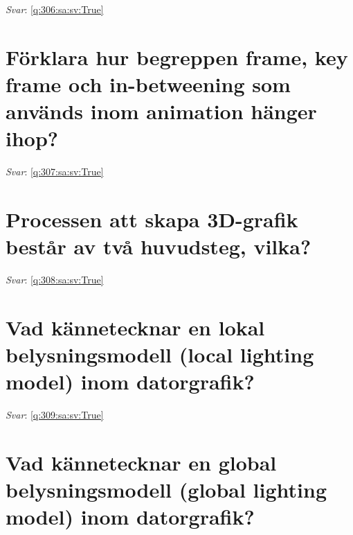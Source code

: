 \documentclass[a4paper,11pt,oneside]{book}
\begin{document}
\begin{sloppypar}
\vspace{1cm}

\textit{Svar}: \autoref{q:306:sa:sv:True}



\section{F\"orklara hur begreppen frame, key frame och in-betweening som anv\"ands inom animation h\"anger ihop?}

\label{q:307:sa:sv:False}

\vspace{2cm}

\noindent\makebox[\textwidth]{\hrulefill}

\vspace{1cm}

\textit{Svar}: \autoref{q:307:sa:sv:True}



\section{Processen att skapa 3D-grafik best\r{a}r av tv\r{a} huvudsteg, vilka?}

\label{q:308:sa:sv:False}

\vspace{2cm}

\noindent\makebox[\textwidth]{\hrulefill}

\vspace{1cm}

\textit{Svar}: \autoref{q:308:sa:sv:True}



\section{Vad k\"annetecknar en lokal belysningsmodell (local lighting model) inom datorgrafik?}

\label{q:309:sa:sv:False}

\vspace{2cm}

\noindent\makebox[\textwidth]{\hrulefill}

\vspace{1cm}

\textit{Svar}: \autoref{q:309:sa:sv:True}



\section{Vad k\"annetecknar en global belysningsmodell (global lighting model) inom datorgrafik?}


\end{sloppypar}
\end{document}
